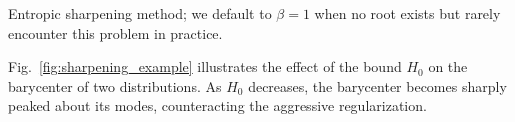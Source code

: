 
\begin{algorithm}[t]
\fbox{\hspace{-.1in}\parbox{\columnwidth}{%
\begin{algorithmic}
\Function{Entropic-Sharpening}{$\p,H_0;\a$}
	\If{$H(\p)+\a^\top\p>H_0+1$}
		\Let{$\beta$}{\Call{Find-Root}{$\a^\top\p^\beta+H(\p^\beta)-(1+H_0)$; $\beta\geq0$}}
\EndIf
		\algorithmicelse\ $\beta\gets1$%
	\State \Return{$\p^\beta$}%
\EndFunction
  \end{algorithmic}
}}
\vspace{-3mm}
\caption{Entropic sharpening method; we default to $\beta=1$ when no root exists but rarely encounter this problem in practice.\vspace{-6mm}}\label{alg:entropic_sharpening}%
\end{algorithm}

Fig.~\ref{fig:sharpening_example} illustrates the effect of the bound $H_0$ on the barycenter of two distributions.  As $H_0$ decreases, the barycenter becomes sharply peaked about its modes, counteracting the aggressive regularization.

